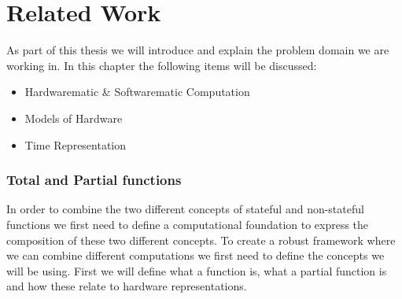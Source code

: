 \newcommand{\framedhslinecorrect}[2]%
  {#1[#2]}

\newcommand{\framedhs}{\sethscode{framedhscode}}


\newenvironment{inlinehscode}%
  {\(\def\column##1##2{}%
   \let\>\undefined\let\<\undefined\let\\\undefined
   \newcommand\>[1][]{}\newcommand\<[1][]{}\newcommand\\[1][]{}%
   \def\fromto##1##2##3{##3}%
   \def\nextline{}}{\) }%

\newcommand{\inlinehs}{\sethscode{inlinehscode}}


\newenvironment{joincode}%
  {\let\orighscode=\hscode
   \let\origendhscode=\endhscode
   \def\endhscode{\def\hscode{\endgroup\def\@currenvir{hscode}\\}\begingroup}
   \orighscode\def\hscode{\endgroup\def\@currenvir{hscode}}}%
  {\origendhscode
   \global\let\hscode=\orighscode
   \global\let\endhscode=\origendhscode}%

\makeatother
\EndFmtInput
%

\chapter{Related Work}
As part of this thesis we will introduce and explain the problem domain we are working in. 
In this chapter the following items will be discussed:
\begin{itemize}
 \item Hardwarematic \& Softwarematic Computation
 \item Models of Hardware
 \item Time Representation 
\end{itemize}

\subsection{Total and Partial functions}
In order to combine the two different concepts of stateful and non-stateful functions we first need to define a computational foundation to express the composition of these two different concepts.
To create a robust framework where we can combine different computations we first need to define the concepts we will be using.
First we will define what a function is, what a partial function is and how these relate to hardware representations.

